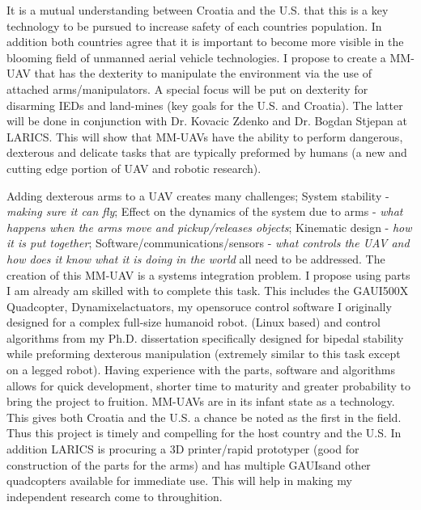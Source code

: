 \documentclass[12pt]{article}
\begin{document}
It is a mutual understanding between Croatia and the U.S. that this is a key technology to be pursued to increase safety of each countries population.
In addition both countries agree that it is important to become more visible in the blooming field of unmanned aerial vehicle technologies.
I propose to create a MM-UAV that has the dexterity to manipulate the environment via the use of attached  arms/manipulators. 
A special focus will be put on dexterity for disarming IEDs and land-mines (key goals for the U.S. and Croatia).  
The latter will be done in conjunction with Dr. Kovacic Zdenko and Dr. Bogdan Stjepan at LARICS.  
This will show that MM-UAVs have the ability to perform dangerous, dexterous and delicate tasks that are typically preformed by humans (a new and cutting edge portion of UAV and robotic research).

Adding dexterous arms to a UAV creates many challenges; 
System stability -  \textit{making sure it can fly};
Effect on the dynamics of the system due to arms - \textit{what happens when the arms move and pickup/releases objects};
Kinematic design -  \textit{how it is put together};
Software/communications/sensors -  \textit{what controls the UAV and how does it know what it is doing in the world} all need to be addressed.  
The creation of this MM-UAV is a systems integration problem.  
I propose using parts I am already am skilled with to complete this task.
This includes the GAUI\texttrademark 500X Quadcopter, Dynamixel\texttrademark actuators, my opensoruce control software I originally designed for a complex full-size humanoid robot.
(Linux based) and control algorithms from my Ph.D. dissertation specifically designed for bipedal stability while preforming dexterous manipulation (extremely similar to this task except on a legged robot).  
Having experience with the parts, software and algorithms allows for quick development, shorter time to maturity and greater probability to bring the project to fruition.  
MM-UAVs are in its infant state as a technology.
This gives both Croatia and the U.S. a chance be noted as the first in the field.
Thus this project is timely and compelling for the host country and the U.S.  
In addition LARICS is procuring a 3D printer/rapid prototyper (good for construction of the parts for the arms) and has multiple GAUIs\texttrademark and other quadcopters available for immediate use.  This will help in making my independent research come to throughition.
\end{document}

